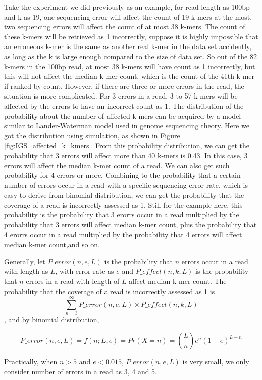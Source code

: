 Take the experiment we did
previously as an example, for read length as 100bp and k as 19, one sequencing
error will affect the count of 19 k-mers at the most, two sequencing errors
will affect the count of at most 38 k-mers. The count of these k-mers will be
retrieved as 1 incorrectly, suppose it is highly impossible that an erroneous
k-mer is the same as another real k-mer in the data set accidently, as long as
the k is large enough compared to the size of data set. So out of the 82 k-mers
in the 100bp read, at most 38 k-mers will have count as 1 incorrectly, but this
will not affect the median k-mer count, which is the count of the 41th k-mer if
ranked by count. However, if there are three or more errors in the read, the 
situation is more complicated. For 3 errors in a read, 3 to 57 k-mers
will be affected by the errors to have an incorrect count as 1. The 
distribution of the probability about the number of affected k-mers can be
acquired by a model similar to Lander-Waterman model used in genome sequencing
 theory. Here we got the distribution using simulation, as shown in Figure
\ref{fig:IGS_affected_k_kmers}. From this probability distribution, we can get
the probability that 3 errors will affect more than 40 k-mers is 0.43. In this
case, 3 errors will affect the median k-mer count of a read. We can also get 
such probability for 4 errors or more. Combining to the probability that a
certain number of errors occur in a read with a specific sequencing error rate,
which is easy to derive from binomial distribution, we can get the probability
that the coverage of a read is incorrectly assessed as 1. Still for the example
here, this probability is the probability that 3 erorrs occur in a read
multiplied by the probability that 3 errors will affect median k-mer count,
plus the probability that 4 erorrs occur in a read multiplied by the 
probability that 4 errors will affect median k-mer count,and so on.

Generally, let $P\_error(n,e,L)$ is the probability that $n$ errors occur in a 
read with length as $L$, with error rate as $e$ and $P\_effect(n,k,L)$ is the 
probability that $n$ 
errors in a read with length of $L$ affect median k-mer count. The probability 
that the coverage of a read is incorrectly assessed as 1 is 
\[\sum_{n=3}^{\infty} P\_error(n,e,L) \times P\_effect(n,k,L)  \],
and by binomial distribution,

\[P\_error(n,e,L) = f(n;L,e) = Pr(X=n) = {L \choose n}e^n(1-e)^{L-n} \] 

Practically, when $n>5$ and $e<0.015$, $P\_error(n,e,L)$ is very small, we only consider
number of errors in a read as 3, 4 and 5.

